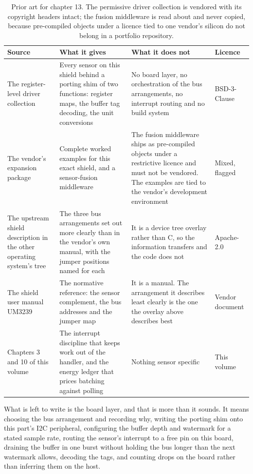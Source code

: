 \begin{table}[H]\centering\small
\begin{tabular}{p{32mm}p{46mm}p{40mm}p{20mm}}
\toprule
Source & What it gives & What it does not & Licence \\
\midrule
The register-level driver collection & Every sensor on this shield behind a porting shim of two functions: register maps, the buffer tag decoding, the unit conversions & No board layer, no orchestration of the bus arrangements, no interrupt routing and no build system & BSD-3-Clause \\
The vendor's expansion package & Complete worked examples for this exact shield, and a sensor-fusion middleware & The fusion middleware ships as pre-compiled objects under a restrictive licence and must not be vendored. The examples are tied to the vendor's development environment & Mixed, flagged \\
The upstream shield description in the other operating system's tree & The three bus arrangements set out more clearly than in the vendor's own manual, with the jumper positions named for each & It is a device tree overlay rather than C, so the information transfers and the code does not & Apache-2.0 \\
The shield user manual UM3239 & The normative reference: the sensor complement, the bus addresses and the jumper map & It is a manual. The arrangement it describes least clearly is the one the overlay above describes best & Vendor document \\
Chapters 3 and 10 of this volume & The interrupt discipline that keeps work out of the handler, and the energy ledger that prices batching against polling & Nothing sensor specific & This volume \\
\bottomrule
\end{tabular}
\caption{Prior art for chapter 13. The permissive driver collection is vendored with its copyright headers intact; the fusion middleware is read about and never copied, because pre-compiled objects under a licence tied to one vendor's silicon do not belong in a portfolio repository.}
\end{table}

What is left to write is the board layer, and that is more than it sounds. It
means choosing the bus arrangement and recording why, writing the porting shim
onto this part's I2C peripheral, configuring the buffer depth and watermark for
a stated sample rate, routing the sensor's interrupt to a free pin on this
board, draining the buffer in one burst without holding the bus longer than the
next watermark allows, decoding the tags, and counting drops on the board rather
than inferring them on the host.

